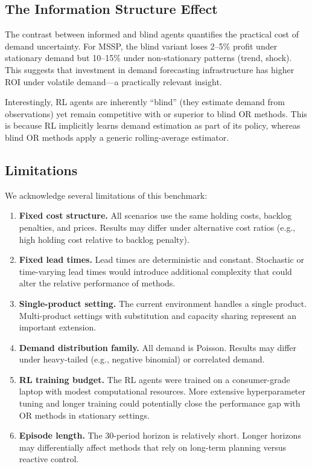 \subsection{The Information Structure Effect}

The contrast between informed and blind agents quantifies the
practical cost of demand uncertainty. For MSSP, the blind variant
loses 2--5\% profit under stationary demand but 10--15\% under
non-stationary patterns (trend, shock). This suggests that investment
in demand forecasting infrastructure has higher ROI under volatile
demand---a practically relevant insight.

Interestingly, RL agents are inherently ``blind'' (they estimate
demand from observations) yet remain competitive with or superior to
blind OR methods. This is because RL implicitly learns demand
estimation as part of its policy, whereas blind OR methods apply a
generic rolling-average estimator.

\subsection{Limitations}

We acknowledge several limitations of this benchmark:

\begin{enumerate}
  \item \textbf{Fixed cost structure.} All scenarios use the same
        holding costs, backlog penalties, and prices. Results may
        differ under alternative cost ratios (e.g., high holding
        cost relative to backlog penalty).

  \item \textbf{Fixed lead times.} Lead times are deterministic and
        constant. Stochastic or time-varying lead times would
        introduce additional complexity that could alter the relative
        performance of methods.

  \item \textbf{Single-product setting.} The current environment
        handles a single product. Multi-product settings with
        substitution and capacity sharing represent an important
        extension.

  \item \textbf{Demand distribution family.} All demand is Poisson.
        Results may differ under heavy-tailed (e.g., negative binomial)
        or correlated demand.

  \item \textbf{RL training budget.} The RL agents were trained on a
        consumer-grade laptop with modest computational resources. More
        extensive hyperparameter tuning and longer training could
        potentially close the performance gap with OR methods in
        stationary settings.

  \item \textbf{Episode length.} The 30-period horizon is relatively
        short. Longer horizons may differentially affect methods that
        rely on long-term planning versus reactive control.
\end{enumerate}

